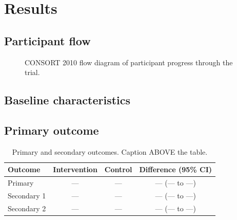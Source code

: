 \documentclass[11pt,a4paper]{article}
\begin{document}
\section{Results}
\label{sec:results}

\subsection{Participant flow}

\begin{figure}[t]
\centering
\fbox{\rule{0pt}{6cm}\rule{0.9\textwidth}{0pt}}
\caption{CONSORT 2010 flow diagram of participant progress through the trial.}
\label{fig:consort}
\end{figure}

\subsection{Baseline characteristics}

\subsection{Primary outcome}

\begin{table}[t]
\caption{Primary and secondary outcomes. Caption ABOVE the table.}
\label{tab:outcomes}
\centering
\begin{tabular}{lccc}
\toprule
Outcome        & Intervention   & Control        & Difference (95\% CI) \\
\midrule
Primary        & ---            & ---            & --- (--- to ---)      \\
Secondary 1    & ---            & ---            & --- (--- to ---)      \\
Secondary 2    & ---            & ---            & --- (--- to ---)      \\
\bottomrule
\end{tabular}
\end{table}
\end{document}
